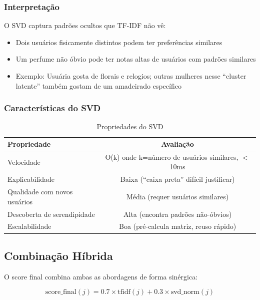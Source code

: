 \documentclass[12pt,a4paper]{article}
\begin{document}
\subsubsection{Interpretação}

O SVD captura padrões ocultos que TF-IDF não vê:

\begin{itemize}
    \item Dois usuários fisicamente distintos podem ter preferências similares
    \item Um perfume não óbvio pode ter notas altas de usuários com padrões similares
    \item Exemplo: Usuária gosta de florais e relogios; outras mulheres nesse ``cluster latente'' também gostam de um amadeirado específico
\end{itemize}

\subsubsection{Características do SVD}

\begin{table}[H]
\centering
\begin{tabular}{|l|c|}
\toprule
\textbf{Propriedade} & \textbf{Avaliação} \\
\midrule
Velocidade & O(k) onde k=número de usuários similares, $<$ 10ms \\
Explicabilidade & Baixa (``caixa preta'' difícil justificar) \\
Qualidade com novos usuários & Média (requer usuários similares) \\
Descoberta de serendipidade & Alta (encontra padrões não-óbvios) \\
Escalabilidade & Boa (pré-calcula matriz, reuso rápido) \\
\bottomrule
\end{tabular}
\caption{Propriedades do SVD}
\label{tab:svd}
\end{table}

\subsection{Combinação Híbrida}

O score final combina ambas as abordagens de forma sinérgica:

\begin{equation}
\text{score\_final}(j) = 0.7 \times \text{tfidf}(j) + 0.3 \times \text{svd\_norm}(j)
\end{equation}
\end{document}
